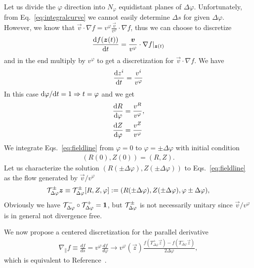Let us divide the $\varphi$ direction into $N_\varphi$ equidistant planes of
$\Delta \varphi$. Unfortunately, from Eq.~\eqref{eq:integralcurve} we cannot easily determine
$\Delta s$ for given $\Delta \varphi$. However, we know that $\vec v\cdot\nabla f = v^\varphi \frac{\vec v}{v^\varphi}\cdot\nabla f$,
thus we can choose to
discretize
\begin{align}
    \frac{\mathrm{d} f({\boldsymbol{z}}(t))}{\mathrm{d} t} = \frac{{\boldsymbol{v}}}{v^\varphi}\cdot \nabla f|_{{\boldsymbol{z}}(t)}
\end{align}
and in the end multiply by $v^\varphi$ to get a discretization for $\vec v\cdot \nabla f$.
We have
\begin{align}
    \frac{\mathrm{d} z^i}{\mathrm{d} t} = \frac{v^i}{v^\varphi}
    \label{}
\end{align}
In this case $\mathrm{d}\varphi/\mathrm{d} t = 1 \Rightarrow t=\varphi$ and we get
\begin{subequations}
\begin{align}
    \frac{\d R}{\d\varphi}&= \frac{v^R}{v^\varphi},\\ %
    \frac{\d Z}{\d\varphi}&=\frac{v^Z}{v^\varphi}%
\end{align}
\label{eq:fieldline}
\end{subequations}
We integrate Eqs.~\eqref{eq:fieldline} from $\varphi=0$ to $\varphi=\pm \Delta \varphi$
with initial condition
\begin{align}
    (R(0), Z(0)) = (R, Z).
    \label{}
\end{align}
Let us characterize the solution $(R(\pm \Delta \varphi), Z(\pm \Delta \varphi))$ to Eqs.~\eqref{eq:fieldline} as the flow generated by $\vec v/v^\varphi$
\begin{align}
    \mathcal T^\pm_{\Delta\varphi}{\boldsymbol{z}} \equiv \mathcal T^\pm_{\Delta\varphi}[R, Z, \varphi]:= ( R(\pm \Delta\varphi), Z( \pm \Delta\varphi), \varphi\pm\Delta \varphi),
    \label{}
\end{align}
Obviously we have $\mathcal T^-_{\Delta\varphi}\circ\mathcal T^+_{\Delta\varphi} = \mathbf{1}$, but $\mathcal T^\pm_{\Delta\varphi}$ is not necessarily unitary since $\vec v/v^\varphi$ is in general
not divergence free.

We now propose a centered discretization for the parallel derivative
\begin{align}
    \nabla_\parallel f \equiv \frac{df}{ds} = v^\varphi\frac{df}{d\varphi}
    \rightarrow v^\varphi(\vec z) \frac{f\left(T_{\Delta\varphi}^+\vec z\right)-f\left(T_{\Delta\varphi}^-\vec z\right)}{2\Delta\varphi},
  \label{eq:paralleldis}
\end{align}
which is equivalent to Reference~\cite{Hariri2014}.

